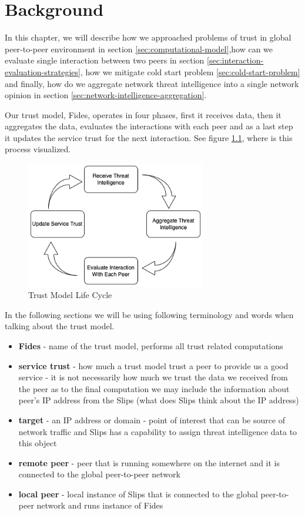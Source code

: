 \chapter{Background}
\label{ch:background}
In this chapter, we will describe how we approached problems of trust in global peer-to-peer environment in section \ref{sec:computational-model},how can we evaluate single interaction between two peers in section \ref{sec:interaction-evaluation-strategies}, how we mitigate cold start problem \ref{sec:cold-start-problem} and finally, how do we aggregate network threat intelligence into a single network opinion in section \ref{sec:network-intelligence-aggregation}.

Our trust model, Fides, operates in four phases, first it receives data, then it aggregates the data, evaluates the interactions with each peer and as a last step it updates the service trust for the next interaction.
See figure \ref{fig:trust-model-life-cycle}, where is this process visualized.

\begin{figure}[ht!]
    \centering
    \includegraphics[width=0.7\textwidth]{assets/service_trust_diagram.png}
    \caption{Trust Model Life Cycle}
    \label{fig:trust-model-life-cycle}
\end{figure}

In the following sections we will be using following terminology and words when talking about the trust model.

\begin{itemize}
\item \textbf{Fides} - name of the trust model, performs all trust related computations
\item \textbf{service trust} - how much a trust model trust a peer to provide us a good service - it is not necessarily how much we trust the data we received from the peer as to the final computation we may include the information about peer's IP address from the Slips (what does Slips think about the IP address)
\item \textbf{target} - an IP address or domain - point of interest that can be source of network traffic and Slips has a capability to assign threat intelligence data to this object
\item \textbf{remote peer} - peer that is running somewhere on the internet and it is connected to the global peer-to-peer network
\item \textbf{local peer} - local instance of Slips that is connected to the global peer-to-peer network and runs instance of Fides
\end{itemize}

